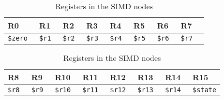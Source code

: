 \begin{table}[h]
  \centering
  \begin{tabularx}{\linewidth}{XXXXXXXXX}\toprule
    R0 & R1 & R2 & R3 & R4 & R5 & R6 & R7 \\ \midrule
    \tt \$zero & \tt \$r1 & \tt \$r2 & \tt \$r3 & \tt \$r4 & \tt \$r5 &
    \tt \$r6 & \tt \$r7\\ \bottomrule
  \end{tabularx}
  \begin{tabularx}{\linewidth}{XXXXXXXX}
    R8 & R9 & R10 & R11 & R12 & R13 & R14 & R15 \\ \midrule
    \tt \$r8 & \tt \$r9 & \tt \$r10 & \tt \$r11 & \tt \$r12 & \tt \$r13 &
    \tt \$r14 & \tt \$state\\ \bottomrule
  \end{tabularx}
  \caption{Registers in the SIMD nodes}
  \label{tab:simd-registers}
\end{table}
